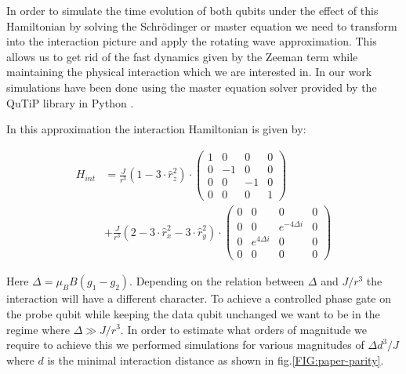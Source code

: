 In order to simulate the time evolution of both qubits under the effect of this Hamiltonian by solving the Schr\"odinger or master equation we need to transform into the interaction picture and apply the rotating wave approximation. This allows us to get rid of the fast dynamics given by the Zeeman term while maintaining the physical interaction which we are interested in. In our work simulations have been done using the master equation solver provided by the QuTiP library in Python \cite{Johansson2012,Johansson2013}.

In this approximation the interaction Hamiltonian is given by:

\begin{align*}
	H_{int}&= \frac{J}{r^3} (1-3 \cdot \hat{r}_z^2) \cdot
	\begin{pmatrix}
	1 & 0 & 0 & 0 \\
	0 & -1 & 0 & 0 \\
	0 & 0 & -1 & 0 \\
	0 & 0 & 0 & 1 
	\end{pmatrix} \\
	&+ \frac{J}{r^3} (2-3 \cdot \hat{r}_x^2 -3 \cdot \hat{r}_y^2) \cdot
	\begin{pmatrix}
	0 & 0 & 0 & 0 \\
	0 & 0 & e^{-4 \Delta i} & 0 \\
	0 & e^{4 \Delta i} & 0 & 0 \\
	0 & 0 & 0 & 0 
	\end{pmatrix}
\end{align*}

Here $\Delta=\mu_B B (g_1-g_2)$. Depending on the relation between $\Delta$ and $J/r^3$ the interaction will have a different character. 
To achieve a controlled phase gate on the probe qubit while keeping the data qubit unchanged we want to be in the regime where $\Delta \gg J/r^3$.
In order to estimate what orders of magnitude we require to achieve this we performed simulations for various magnitudes of $\Delta d^3/ J$ where $d$ is the minimal interaction distance as shown in fig.\@ \ref{FIG:paper-parity}.

